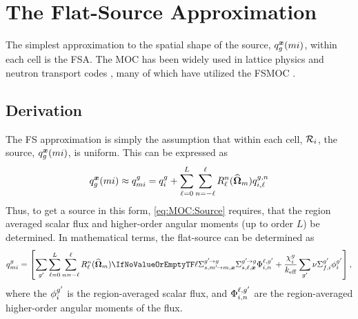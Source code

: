 {    \section{The Flat-Source Approximation}{\label{sec:MOC:FSA}
        The simplest approximation to the spatial shape of the source, $\source[mi][g][\loc]$, within each cell is the \ac{FSA}.
        The \ac{MOC} has been widely used in lattice physics and neutron transport codes \cite{Knott2010}, many of which have utilized the \ac{FSMOC} \cite{Halsall1980,Hong1998,Saji2000,Smith2002,Sugimura2006,Masiello2008,Boyd2014,Collins2016}.

        \subsection{Derivation}{\label{ssec:MOC:FSA:Derivation}
            The \ac{FS} approximation is simply the assumption that within each cell, $\Region$, the source, $\source[mi][g][\loc]$, is uniform.
            This can be expressed as
            \begin{equation}\label{eq:MOC:FSA:Source Shape}
                \source[mi][g][\loc] \approx \srcF[mi] = \srcF + \suml[\ell=0][L]\suml[n=-\ell][\ell]\SH[\ell][n][\dirm]\srcF[i,\ell][g,n]
            \end{equation}
            Thus, to get a source in this form, \cref{eq:MOC:Source} requires, that the region averaged scalar flux and higher-order angular moments (up to order $L$) be determined.
            In mathematical terms, the flat-source can be determined as
            \begin{equation}\label{eq:MOC:FSA:Source Computation}
                \srcF[mi] =
                    \left[
                        \suml[\gprime]\suml[\ell=0][L]\suml[n=-\ell][\ell]\SH[\ell][n][\dirm]\xss[\ell]\afluxmom[\gprime]
                        + \frac{\spect}{\keff}\suml[\gprime]\nufis\sflux[\gprime]
                    \right],
            \end{equation}
            where the $\sflux[\gprime]$ is the region-averaged scalar flux, and $\afluxmom[\gprime]$ are the region-averaged higher-order angular moments of the flux.

}}}
